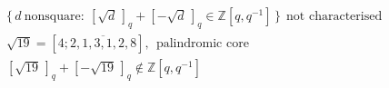 \documentclass{article}
\begin{document}
\[
\begin{aligned}
&\{\,d\ \text{nonsquare}:\ [\sqrt d\,]_q+[-\sqrt d\,]_q\in\mathbb{Z}[q,q^{-1}]\,\}\ \ \text{not characterised}\\
&\sqrt{19}=[4;\overline{2,1,3,1,2,8}],\ \ \text{palindromic core}\\
&[\sqrt{19}\,]_q+[-\sqrt{19}\,]_q\notin\mathbb{Z}[q,q^{-1}]
\end{aligned}
\]
\end{document}
